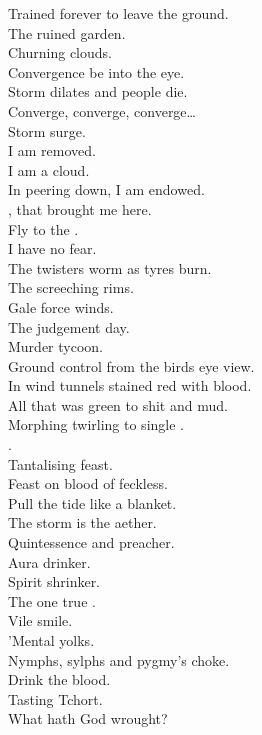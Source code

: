 Trained forever to leave the ground. \\
The ruined garden. \\
Churning clouds. \\
Convergence be into the eye. \\
Storm dilates and people die. \\

Converge, converge, converge… \\
Storm surge. \\

I am removed. \\
I am a cloud. \\
In peering down, I am endowed. \\
, that brought me here. \\
Fly to the . \\
I have no fear. \\

The twisters worm as tyres burn. \\
The screeching rims. \\
Gale force winds. \\
The judgement day. \\
Murder tycoon. \\
Ground control from the birds eye view. \\

In wind tunnels stained red with blood. \\
All that was green to shit and mud. \\

Morphing twirling to single . \\
. \\
Tantalising feast. \\

Feast on blood of feckless. \\
Pull the tide like a blanket. \\

The storm is the aether. \\
Quintessence and preacher. \\
Aura drinker. \\
Spirit shrinker. \\
The one true . \\
Vile smile. \\
'Mental yolks. \\
Nymphs, sylphs and pygmy's choke. \\
Drink the blood. \\
Tasting Tchort. \\
What hath God wrought? \\

